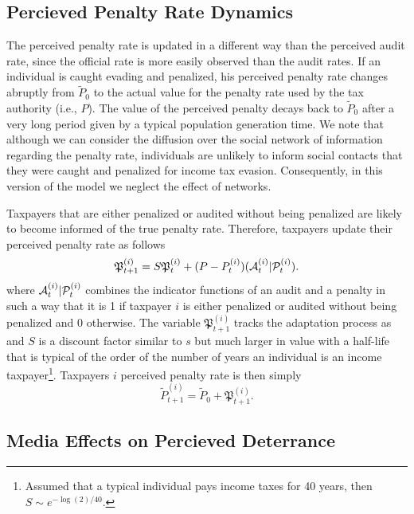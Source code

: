 \documentclass{NSF_proposal_mod}
\begin{document}
\subsection{Percieved Penalty Rate Dynamics}

The perceived penalty rate is updated in a different way than the perceived audit rate, since the official rate is more easily observed than the audit rates. If  an individual is caught evading and penalized, his perceived penalty rate changes abruptly from $\tilde{P}_0$ to the actual value for the penalty rate used by the tax authority (i.e., $P$). The value of the perceived penalty decays back to $\tilde{P}_0$ after a very long period given by a typical population generation time. We note that although we can consider the diffusion over the social network of information regarding the penalty rate, individuals are unlikely to inform social contacts that they were caught and penalized for income tax evasion. Consequently, in this version of the model we neglect the effect of networks. 

Taxpayers that are either penalized or audited without being penalized are likely to become informed of the true penalty rate. Therefore, taxpayers update their perceived penalty rate as follows 
\begin{equation}
{\mathfrak P}^{(i)}_{t+1}=S {\mathfrak P}^{(i)}_{t} + (P- P^{(i)}_{t})({\cal A}^{(i)}_t |{\cal P}^{(i)}_t).
\end{equation}
where ${\cal A}^{(i)}_t |{\cal P}^{(i)}_t$ combines the indicator functions of an audit and a penalty in such a way that it is 1 if taxpayer $i$ is either penalized or audited without being penalized and 0 otherwise. The variable ${\mathfrak P}_{t+1}^{(i)}$ tracks the adaptation process as and $S$ is a discount factor similar to $s$ but much larger in value with a half-life that is typical of the order of the number of years an individual is an income taxpayer\footnote{Assumed that a typical individual pays income taxes for 40 years, then $S \sim e^{-\log(2)/40}$.}. Taxpayers $i$ perceived penalty rate is then simply 
\begin{equation}
\tilde{P}^{(i)}_{t+1} =\tilde{P}_0+{\mathfrak P}^{(i)}_{t+1}.
\end{equation}


\subsection{Media Effects on Percieved Deterrance}
\label{Sec:Media_Effect_Deterrance}
\end{document}
